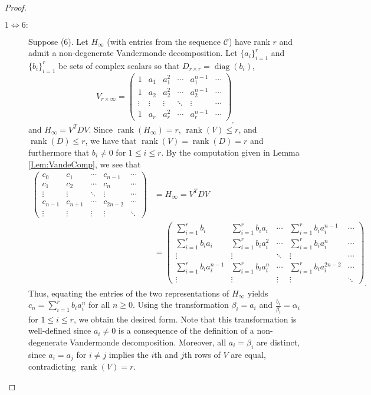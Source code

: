 \documentclass[12pt,reqno]{article}
\DeclareMathOperator{\diag}{diag}
\DeclareMathOperator{\rank}{rank}
\begin{document}
\begin{proof}
\begin{description}
\item[$1 \Leftrightarrow 6:$] Suppose (6). Let $H_\infty$ (with entries from the sequence $\mathcal{C}$) have rank $r$ and admit a non-degenerate Vandermonde decomposition. Let $\{a_i\}_{i=1}^r$ and $\{b_i\}_{i=1}^r$ be sets of complex scalars so that $D_{r\times r} = \diag(b_i)$, 
$$
V_{r\times\infty} = \begin{pmatrix}
1 & a_1 & a_1^2 & \cdots & a_1^{n-1} & \cdots \\
1 & a_2 & a_2^2 & \cdots & a_2^{n-1} & \cdots \\
\vdots & \vdots & \vdots & \ddots & \vdots & \cdots \\
1 & a_{r} & a_{r}^2 & \cdots  & a_r^{n-1} & \cdots
\end{pmatrix}_,
$$
and $H_\infty = V^TDV$. Since $\rank(H_\infty) = r$, $\rank(V) \leq r$, and $\rank(D) \leq r$, we have that $\rank(V) = \rank(D) = r$ and furthermore that $b_i\neq 0$ for $1\leq i\leq r$. By the computation given in Lemma \ref{Lem:VandeComp}, we see that 
\begin{align*}
\begin{pmatrix}
c_0 & c_1 & \cdots & c_{n-1} & \cdots \\
c_1 & c_2 & \cdots & c_{n} & \cdots \\
\vdots & \vdots & \ddots & \vdots & \cdots \\
c_{n-1} & c_{n+1} & \cdots & c_{2n-2} & \cdots \\
\vdots & \vdots & \vdots & \vdots & \ddots
\end{pmatrix} &= H_\infty = V^TDV \\
&= \begin{pmatrix}
\sum_{i=1}^r b_i & \sum_{i=1}^r b_i a_i & \cdots & \sum_{i=1}^r b_i a_i^{n-1} & \cdots \\
\sum_{i=1}^r b_i a_i & \sum_{i=1}^r b_i a_i^2 & \cdots & \sum_{i=1}^r b_i a_i^{n} & \cdots \\
\vdots & \vdots & \ddots & \vdots & \cdots \\
\sum_{i=1}^r b_i a_i^{n-1} & \sum_{i=1}^r b_i a_i^n & \cdots & \sum_{i=1}^r b_i a_i^{2n-2} & \cdots \\
\vdots & \vdots & \vdots & \vdots & \ddots
\end{pmatrix}_.
\end{align*}
Thus, equating the entries of the two representations of $H_\infty$ yields $c_n = \sum_{i=1}^r b_i a_i^{n}$ for all $n\geq 0$. Using the transformation $\beta_i = a_i$ and $\frac{b_i}{\beta_i} = \alpha_i$ for $1\leq i\leq r$, we obtain the desired form. Note that this transformation is well-defined since $a_i\neq 0$ is a consequence of the definition of a non-degenerate Vandermonde decomposition. Moreover, all $a_i = \beta_i$ are distinct, since $a_i = a_j$ for $i\neq j$ implies the $i$th and $j$th rows of $V$ are equal, contradicting $\rank(V) = r$. 


\end{description}
\end{proof}
\end{document}
